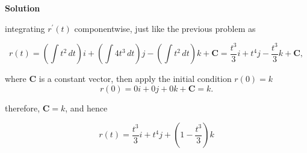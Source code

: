 \documentclass{article}
\newcommand{\solution}{\textbf{\large Solution}}
\theoremstyle{remark}
\begin{document}
\medskip
\solution

integrating $r^'(t)$ componentwise, just like the previous problem as

\[
    r(t) = \left(\int t^{2} \, dt\right) i + \left(\int 4t^{3} \, dt\right) j - \left(\int t^{2} \, dt\right) k + \mathbf{C} = \frac{t^{3}}{3} i + t^{4} j - \frac{t^{3}}{3} k + \mathbf{C},
\]

where $\mathbf{C}$ is a constant vector, then apply the initial condition $r(0) = k$
\[
    r(0) = 0i + 0j + 0k + \mathbf{C} = k.
\]

therefore, $\mathbf{C} = k$, and hence

\[
    \boxed{r(t) = \frac{t^{3}}{3} i + t^{4} j + \left(1 - \frac{t^{3}}{3}\right) k}
\]

\vspace{1em}
\hrulefill
\end{document}
